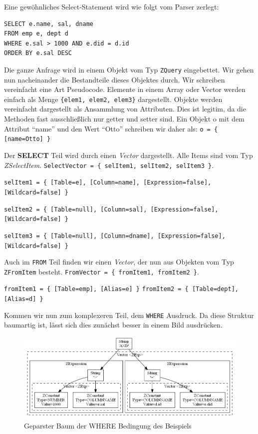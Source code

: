 Eine gewöhnliches Select-Statement wird wie folgt vom Parser zerlegt:
\begin{verbatim}
SELECT e.name, sal, dname 
FROM emp e, dept d 
WHERE e.sal > 1000 AND e.did = d.id 
ORDER BY e.sal DESC\end{verbatim}

Die ganze Anfrage wird in einem Objekt vom Typ \verb|ZQuery| eingebettet. Wir gehen nun nacheinander die Bestandteile dieses Objektes durch. Wir schreiben vereinfacht eine Art Pseudocode. Elemente in einem Array oder Vector werden einfach als Menge \verb|{elem1, elem2, elem3}| dargestellt. Objekte werden vereinfacht dargestellt als Ansammlung von Attributen. Dies ist legitim, da die Methoden fast ausschließlich nur getter und setter sind. Ein Objekt o mit dem Attribut ``name'' und den Wert ``Otto'' schreiben wir daher als: 
\verb|o = { [name=Otto] }|

Der \textbf{SELECT} Teil wird durch einen \textit{Vector} dargestellt. Alle Items sind vom Typ \textit{ZSelectItem}. \verb|SelectVector = { selItem1, selItem2, selItem3 }|.

\verb|selItem1 = { [Table=e], [Column=name], [Expression=false], [Wildcard=false] }|

\verb|selItem2 = { [Table=null], [Column=sal], [Expression=false], [Wildcard=false] }|

\verb|selItem3 = { [Table=null], [Column=dname], [Expression=false], [Wildcard=false] }|

Auch im \verb|FROM| Teil finden wir einen \textit{Vector}, der nun aus Objekten vom Typ \verb|ZFromItem| besteht. \verb|FromVector = { fromItem1, fromItem2 }|.

\verb|fromItem1 = { [Table=emp], [Alias=e] }|
\verb|fromItem2 = { [Table=dept], [Alias=d] }|

Kommen wir nun zum komplexeren Teil, dem \verb|WHERE| Ausdruck. Da diese Struktur baumartig ist, lässt sich dies zunächst besser in einem Bild ausdrücken.

\begin{figure}[h]
\includegraphics[scale=0.51]{Bilder/parserbaum.png}
\caption{Geparster Baum der WHERE Bedingung des Beispiels}
\label{fig:parseTree}
\end{figure}

